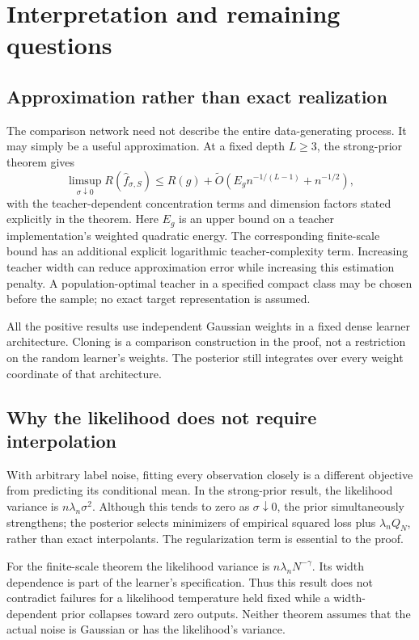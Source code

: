 \section{Interpretation and remaining questions}

\subsection{Approximation rather than exact realization}
The comparison network need not describe the entire data-generating process. It may simply be a useful approximation. At a fixed depth $L\ge3$, the strong-prior theorem gives
\[
 \limsup_{\sigma\downarrow0}R(\widehat f_{\sigma,S})\le R(g)+\widetilde O\!\left(E_g n^{-1/(L-1)}+n^{-1/2}\right),
\]
with the teacher-dependent concentration terms and dimension factors stated explicitly in the theorem. Here $E_g$ is an upper bound on a teacher implementation's weighted quadratic energy. The corresponding finite-scale bound has an additional explicit logarithmic teacher-complexity term. Increasing teacher width can reduce approximation error while increasing this estimation penalty. A population-optimal teacher in a specified compact class may be chosen before the sample; no exact target representation is assumed.

All the positive results use independent Gaussian weights in a fixed dense learner architecture. Cloning is a comparison construction in the proof, not a restriction on the random learner's weights. The posterior still integrates over every weight coordinate of that architecture.

\subsection{Why the likelihood does not require interpolation}
With arbitrary label noise, fitting every observation closely is a different objective from predicting its conditional mean. In the strong-prior result, the likelihood variance is $n\lambda_n\sigma^2$. Although this tends to zero as $\sigma\downarrow0$, the prior simultaneously strengthens; the posterior selects minimizers of empirical squared loss plus $\lambda_n Q_N$, rather than exact interpolants. The regularization term is essential to the proof.

For the finite-scale theorem the likelihood variance is $n\lambda_n N^{-\gamma}$. Its width dependence is part of the learner's specification. Thus this result does not contradict failures for a likelihood temperature held fixed while a width-dependent prior collapses toward zero outputs. Neither theorem assumes that the actual noise is Gaussian or has the likelihood's variance.

